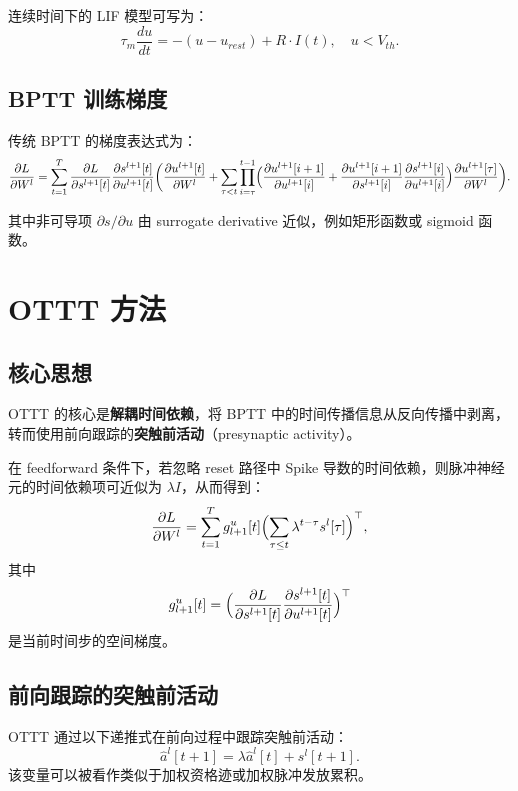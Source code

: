 \documentclass[journal,12pt,onecolumn]{IEEEtran}
\begin{document}
连续时间下的 LIF 模型可写为：
\begin{equation}
  \tau_m \frac{du}{dt} = -(u - u_{rest}) + R \cdot I(t), \quad u < V_{th}.
\end{equation}

\subsection{BPTT 训练梯度}
传统 BPTT 的梯度表达式为：
\begin{equation}
  \frac{\partial L}{\partial W^l} = \sum_{t=1}^T \frac{\partial L}{\partial s^{l+1}[t]} \frac{\partial s^{l+1}[t]}{\partial u^{l+1}[t]} \biggl( \frac{\partial u^{l+1}[t]}{\partial W^l} + \sum_{\tau<t} \prod_{i=\tau}^{t-1} \Bigl( \frac{\partial u^{l+1}[i+1]}{\partial u^{l+1}[i]} + \frac{\partial u^{l+1}[i+1]}{\partial s^{l+1}[i]} \frac{\partial s^{l+1}[i]}{\partial u^{l+1}[i]} \Bigr) \frac{\partial u^{l+1}[\tau]}{\partial W^l} \biggr).
\end{equation}

其中非可导项 $\partial s/\partial u$ 由 surrogate derivative 近似，例如矩形函数或 sigmoid 函数。

\section{OTTT 方法}
\subsection{核心思想}
OTTT 的核心是\textbf{解耦时间依赖}，将 BPTT 中的时间传播信息从反向传播中剥离，转而使用前向跟踪的\textbf{突触前活动}（presynaptic activity）。

在 feedforward 条件下，若忽略 reset 路径中 Spike 导数的时间依赖，则脉冲神经元的时间依赖项可近似为 $\lambda I$，从而得到：
\begin{equation}
  \frac{\partial L}{\partial W^l} = \sum_{t=1}^T g^{u}_{l+1}[t] \Bigl( \sum_{\tau\le t} \lambda^{t-\tau} s^l[\tau] \Bigr)^{\top},
\end{equation}
其中
\begin{equation}
  g^{u}_{l+1}[t] = \Bigl( \frac{\partial L}{\partial s^{l+1}[t]} \frac{\partial s^{l+1}[t]}{\partial u^{l+1}[t]} \Bigr)^\top
\end{equation}
是当前时间步的空间梯度。

\subsection{前向跟踪的突触前活动}
OTTT 通过以下递推式在前向过程中跟踪突触前活动：
\begin{equation}
  \hat a^l[t+1] = \lambda \hat a^l[t] + s^l[t+1].
\end{equation}
该变量可以被看作类似于加权资格迹或加权脉冲发放累积。
\end{document}
